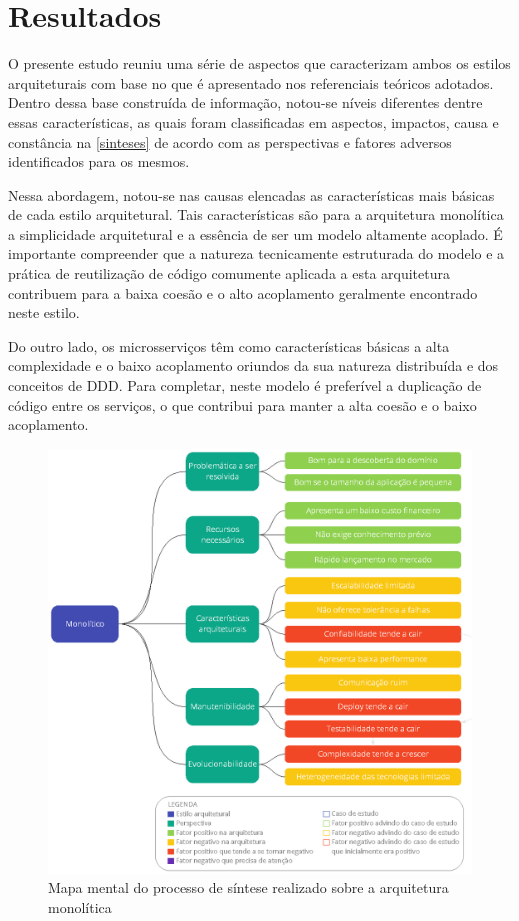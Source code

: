 \chapter{Resultados}

O presente estudo reuniu uma série de aspectos que caracterizam ambos os estilos arquiteturais com
base no que é apresentado nos referenciais teóricos adotados. Dentro dessa base construída de
informação, notou-se níveis diferentes dentre essas características, as quais foram classificadas em
aspectos, impactos, causa e constância na \autoref{sinteses} de acordo com as perspectivas e fatores
adversos identificados para os mesmos.

Nessa abordagem, notou-se nas causas elencadas as características mais básicas de cada estilo
arquitetural. Tais características são para a arquitetura monolítica a simplicidade arquitetural e a
essência de ser um modelo altamente acoplado. É importante compreender que a natureza tecnicamente
estruturada do modelo e a prática de reutilização de código comumente aplicada a esta arquitetura
contribuem para a baixa coesão e o alto acoplamento geralmente encontrado neste estilo.

Do outro lado, os microsserviços têm como características básicas a alta complexidade e o baixo
acoplamento oriundos da sua natureza distribuída e dos conceitos de \gls{DDD}. Para completar, neste
modelo é preferível a duplicação de código entre os serviços, o que contribui para manter a alta
coesão e o baixo acoplamento.

\begin{figure}[h]
  \centering
  \includegraphics[keepaspectratio=true,scale=1]{figuras/sintese-monolitico.eps}
  \caption{Mapa mental do processo de síntese realizado sobre a arquitetura
  monolítica\label{fig:SinteseMono-resultados}}
\end{figure}

